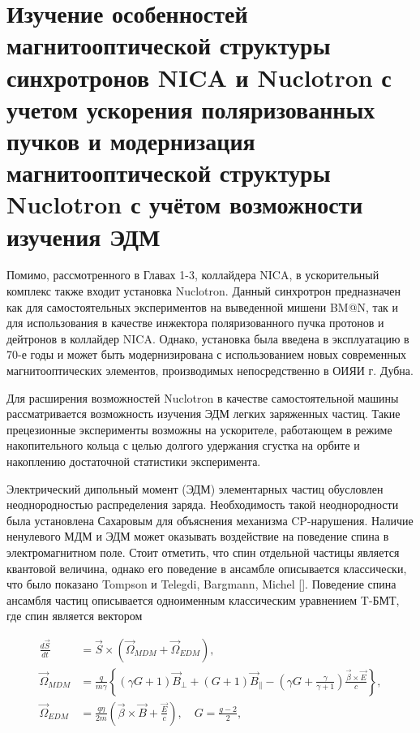 
	\chapter{Изучение особенностей магнитооптической структуры синхротронов NICA и Nuclotron с учетом ускорения поляризованных пучков и модернизация магнитооптической структуры Nuclotron с учётом возможности изучения ЭДМ}\label{ch:EDM}

\par Помимо, рассмотренного в Главах 1-3, коллайдера NICA, в ускорительный комплекс также входит установка Nuclotron. Данный синхротрон предназначен как для самостоятельных экспериментов на выведенной мишени BM@N, так и для использования в качестве инжектора поляризованного пучка протонов и дейтронов в коллайдер NICA. Однако, установка была введена в эксплуатацию в 70-е годы и может быть модернизирована с использованием новых современных магнитооптических элементов, производимых непосредственно в ОИЯИ г. Дубна.

\par Для расширения возможностей Nuclotron в качестве самостоятельной машины рассматривается возможность изучения ЭДМ легких заряженных частиц. Такие прецезионные эксперименты возможны на ускорителе, работающем в режиме накопительного кольца с целью долгого удержания сгустка на орбите и накоплению достаточной статистики эксперимента. 

\par Электрический дипольный момент (ЭДМ) элементарных частиц обусловлен неоднородностью распределения заряда. Необходимость такой неоднородности была установлена Сахаровым для объяснения механизма CP-нарушения. Наличие ненулевого МДМ и ЭДМ может оказывать воздействие на поведение спина в электромагнитном поле.  Стоит отметить, что спин отдельной частицы является квантовой величина, однако его поведение в ансамбле описывается классически, что было показано Tompson и Telegdi, Bargmann, Michel []. Поведение спина ансамбля частиц описывается одноименным классическим уравнением T-БМТ, где спин является вектором

\begin{align} \label{eq:T-BMT}
\frac{{d \vec{S}}}{d t} &=\vec{S} \times\left(\vec{\Omega}_{MDM}+\vec{\Omega}_{EDM}\right), \nonumber\\
\vec{\Omega}_{MDM}&=\frac{q}{m \gamma}\left\{(\gamma G+1)\vec{B}_{\perp}+(G+1)\vec{B}_{\parallel}-\left(\gamma G+\frac{\gamma}{\gamma+1}\right) \frac{\vec{\beta} \times \vec{E}}{c}\right\}, \\
\vec{\Omega}_{EDM}&=\frac{q \eta}{2 m}\left(\vec{\beta} \times \vec{B}+\frac{\vec{E}}{c}\right), \quad G=\frac{g-2}{2},\nonumber
\end{align}

